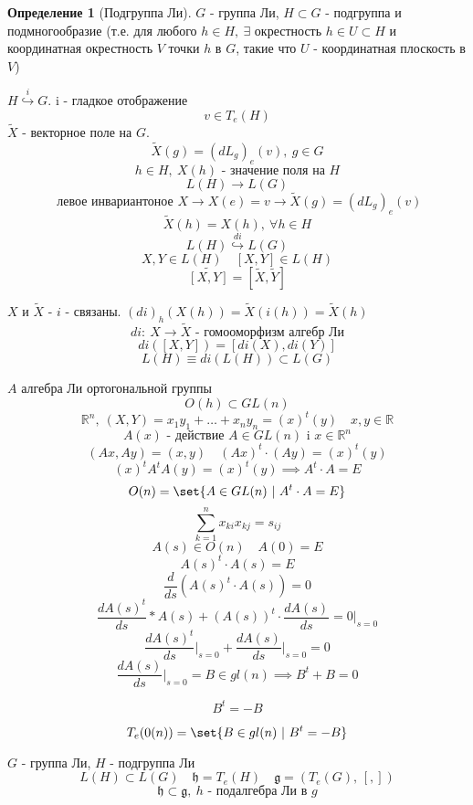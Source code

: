 \documentclass[a4paper]{article}
\DeclarePairedDelimiter\set\{\}
\theoremstyle{definition}
\newtheorem*{definition}{Определение}
\theoremstyle{remark}
\begin{document}
\begin{tcolorbox}[title=Подгруппа Ли]
    \begin{definition}[Подгруппа Ли]
        $ G $ - группа Ли, $ H \subset G $ - подгруппа и подмногообразие (т.е. для любого
        $ h \in H, \ \exists $ окрестность $ h \in U \subset H $ и координатная окрестность
        $ V $ точки $ h $ в $ G $, такие что $ U $ - координатная плоскость в $ V $)  
    \end{definition}
\end{tcolorbox}

$ H \stackrel{i}{\hookrightarrow} G $. i - гладкое отображение 
\[
    v \in T_e(H)
\]
$ \widetilde{X} $ - векторное поле на $ G $.
\[
    \widetilde{X}(g) = (dL_g)_e(v), \ g \in G
\]
\[
    h \in H, \ X(h) \text{ - значение поля на } H
\]
\[
    L(H) \to L(G)
\]
\[
    \text{ левое инвариантоное }X \to X(e) = v \to \widetilde{X}(g) = (dL_g)_e(v)
\]
\[
    \widetilde{X}(h) = X(h), \ \forall h \in H
\]
\[
    L(H) \stackrel{di}{\hookrightarrow} L(G)
\]
\[
    X,Y \in L(H) \quad [X,Y] \in L(H)
\]
\[
    \widetilde{[X,Y]} = [\widetilde{X}, \widetilde{Y}]
\]

$ X $ и $ \widetilde{X} $ - $ i $ - связаны. $ (di)_h(X(h)) = \widetilde{X}(i(h)) =
\widetilde{X}(h)$ 
\[
    di: \ X \to \widetilde{X} \text{ - гомооморфизм алгебр Ли}
\]
\[
    di([X,Y]) = [di(X), di(Y)]
\]
\[
    L(H) \equiv di(L(H)) \subset L(G)
\]

$ A $ алгебра Ли ортогональной группы
\[
    O(h) \subset GL(n)
\]
\[
    \mathbb{R}^n, \ (X,Y) = x_1 y_1 + \dots + x_n y_n = 
    (x)^t (y) \quad x,y \in \mathbb{R}
\]
\[
    A(x) \text{ - действие } A \in GL(n) \text{ i } x \in \mathbb{R}^n
\]
\[
    (Ax, Ay) = (x,y) \quad (Ax)^t \cdot (Ay) = (x)^t (y)
\]
\[
    (x)^t A^t A (y) = (x)^t (y) \implies A^t \cdot A = E
\]
\[
    O(n) = \set{A \in GL(n) \ | \ A^t \cdot A = E}
\]
\[
    \sum_{k=1}^{n} x_{ki} x_{kj} = s_{ij} 
\]
\[
    A(s) \in O(n) \quad A(0) = E
\]
\[
    A(s)^t \cdot A(s) = E
\]
\[
    \frac{d}{ds} (A(s)^t \cdot A(s)) = 0
\]
\[
    \frac{dA(s)^t}{ds} * A(s) + (A(s))^t \cdot \frac{dA(s)}{ds} = 0 \bigg|_{s=0}
\]
\[
    \frac{dA(s)^t}{ds} \bigg|_{s=0} + \frac{dA(s)}{ds} \bigg|_{s=0} = 0
\]
\[
    \frac{dA(s)}{ds}\bigg|_{s=0} = B \in gl(n) \implies B^t + B = 0
\]
\begin{tcolorbox}
    \[
        B^t = -B
    \]
\end{tcolorbox}

\[
    T_e(0(n)) = \set{B \in gl(n) \ | \ B^t = -B}
\]

$ G $ - группа Ли, $ H $ - подгруппа Ли
\[
    L(H) \subset L(G) \quad \mathfrak{h} = T_e(H) \quad \mathfrak{g} = (T_e(G), \, [,])
\]
\[
    \mathfrak{h} \subset \mathfrak{g}, \ h \text{ - подалгебра Ли в } g
\]
\end{document}
